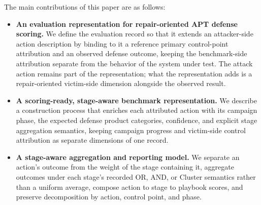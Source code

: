 The main contributions of this paper are as follows:
\begin{itemize}
    \item \textbf{An evaluation representation for repair-oriented APT defense scoring.} We
    define the evaluation record so that it extends an attacker-side action description by
    binding to it a reference primary control-point attribution and an observed defense
    outcome, keeping the benchmark-side attribution separate from the behavior of the system
    under test. The attack action remains part of the representation; what the representation
    adds is a repair-oriented victim-side dimension alongside the observed result.

    \item \textbf{A scoring-ready, stage-aware benchmark representation.} We describe a
    construction process that enriches each attributed action with its campaign phase, the
    expected defense product categories, confidence, and explicit stage
    aggregation semantics, keeping campaign progress and victim-side control attribution as
    separate dimensions of one record.

    \item \textbf{A stage-aware aggregation and reporting model.} We separate an action's
    outcome from the weight of the stage containing it, aggregate outcomes under each stage's
    recorded OR, AND, or Cluster semantics rather than a uniform average, compose action to
    stage to playbook scores, and preserve decomposition by action, control point, and phase.
\end{itemize}
